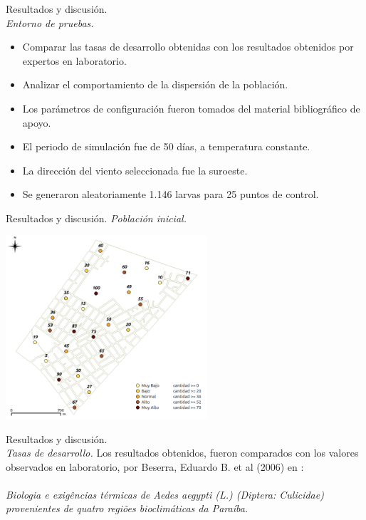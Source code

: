 \begin{frame}[t]{Resultados y discusión.\\\textit{Entorno de pruebas.}}
\begin{itemize}
	\item Comparar las tasas de desarrollo obtenidas con los resultados obtenidos por expertos en laboratorio.
	\item Analizar el comportamiento de la dispersión de la población.
    \item Los parámetros de configuración fueron tomados del material bibliográfico de apoyo.
    \item El periodo de simulación fue de 50 días, a temperatura constante.
    \item La dirección del viento seleccionada fue la suroeste.
    \item Se generaron aleatoriamente 1.146 larvas para 25 puntos de control.
    \end{itemize}
\end{frame}

\begin{frame}[t]{Resultados y discusión. \textit{Población inicial.}}
    \begin{center}
        \includegraphics[width=7.5cm]{./graphics/extension-poblacion.png}
    \end{center}
\end{frame}
\begin{frame}[t]{Resultados y discusión.\\\textit{Tasas de desarrollo.}}
Los resultados obtenidos, fueron comparados con los valores observados en laboratorio, por Beserra, Eduardo B. et al (2006) en :
\\\text{}
\\\textit{Biologia e exigências térmicas de Aedes aegypti (L.) (Diptera: Culicidae) provenientes de quatro regiões bioclimáticas da Paraíba.}
\end{frame}

